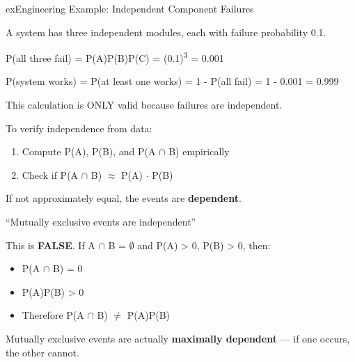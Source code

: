 \begin{PSbox}[unbreakable]{ex}{Engineering Example: Independent Component Failures}

A system has three independent modules, each with failure probability 0.1.

P(all three fail) = P(A)P(B)P(C) = (0.1)\textsuperscript{3} = 0.001

P(system works) = P(at least one works) = 1 - P(all fail) = 1 - 0.001 = 0.999

This calculation is ONLY valid because failures are independent.

\end{PSbox}


To verify independence from data:

\begin{enumerate}
\def\labelenumi{\arabic{enumi}.}
\tightlist
\item
  Compute P(A), P(B), and P(A \ensuremath{\cap} B) empirically
\item
  Check if P(A \ensuremath{\cap} B) \ensuremath{\approx} P(A) \ensuremath{\cdot} P(B)
\end{enumerate}

If not approximately equal, the events are \textbf{dependent}.


\begin{PSquote}

\PSno{} ``Mutually exclusive events are independent''

\end{PSquote}

This is \textbf{FALSE}. If A \ensuremath{\cap} B = \ensuremath{\emptyset} and P(A) \textgreater{} 0, P(B) \textgreater{} 0, then:

\begin{itemize}
\tightlist
\item
  P(A \ensuremath{\cap} B) = 0
\item
  P(A)P(B) \textgreater{} 0
\item
  Therefore P(A \ensuremath{\cap} B) \ensuremath{\neq} P(A)P(B)
\end{itemize}

Mutually exclusive events are actually \textbf{maximally dependent} — if one occurs, the other cannot.




